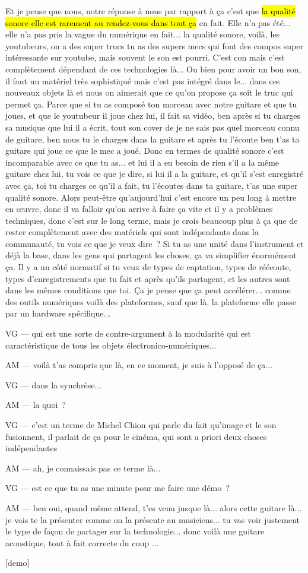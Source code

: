 Et je pense que nous, notre réponse à nous par rapport à ça c'est que \hl{la qualité sonore elle est rarement au rendez-vous dans tout ça} en fait. Elle n'a pas été... elle n'a pas pris la vague du numérique en fait... la qualité sonore, voilà, les youtubeurs, on a des super trucs tu as des supers mecs qui font des compos super intéressante sur youtube, mais souvent le son est pourri. C'est con mais c'est complètement dépendant de ces technologies là... Ou bien pour avoir un bon son, il faut un matériel très sophistiqué mais c'est pas intégré dans le... dans ces nouveaux objets là et nous on aimerait que ce qu'on propose ça soit le truc qui permet ça. Parce que si tu as composé ton morceau avec notre guitare et que tu joues, et que le youtubeur il joue chez lui, il fait sa vidéo, ben après si tu charges sa musique que lui il a écrit, tout son cover de je ne sais pas quel morceau connu de guitare, ben nous tu le charges dans la guitare et après tu l'écoute ben t'as ta guitare qui joue ce que le mec a joué. Donc en termes de qualité sonore c'est incomparable avec ce que tu as... et lui il a eu besoin de rien s'il a la même guitare chez lui, tu vois ce que je dire, si lui il a la guitare, et qu'il s'est enregistré avec ça, toi tu charges ce qu'il a fait, tu l'écoutes dans ta guitare, t'as une super qualité sonore. Alors peut-être qu'aujourd'hui c'est encore un peu long à mettre en œuvre, donc il va falloir qu'on arrive à faire ça vite et il y a problèmes techniques, donc c'est sur le long terme, mais je crois beaucoup plus à ça que de rester complètement avec des matériels qui sont indépendants dans la communauté, tu vois ce que je veux dire ? Si tu as une unité dans l'instrument et déjà la base, dans les gens qui partagent les choses, ça va simplifier énormément ça. Il y a un côté normatif si tu veux de types de captation, types de réécoute, types d'enregistrements que tu fait et après qu'ils partagent, et les autres sont dans les mêmes conditions que toi. Ça je pense que ça peut accélérer... comme des outils numériques voilà des plateformes, sauf que là, la plateforme elle passe par un hardware spécifique... 

VG — qui est une sorte de contre-argument à la modularité qui est caractéristique de tous les objets électronico-numériques... 

AM — voilà t'as compris que là, en ce moment, je suis à l'opposé de ça... 

VG — dans la synchrèse... 

AM — la quoi ?

VG — c'est un terme de Michel Chion qui parle du fait qu'image et le son fusionnent, il parlait de ça pour le cinéma, qui sont a priori deux choses indépendantes

AM — ah, je connaissais pas ce terme là...

VG — est ce que tu as une minute pour me faire une démo ?

AM — ben oui, quand même attend, t'es venu jusque là... alors cette guitare là...  je vais te la présenter comme on la présente au musiciens... tu vas voir justement le type de façon de partager sur la technologie... donc voilà une guitare acoustique, tout à fait correcte du coup ... 

[demo] 
